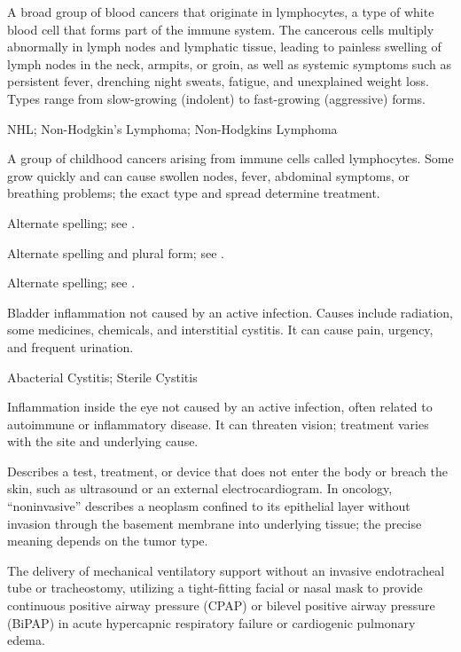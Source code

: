  A broad group of blood cancers that originate in lymphocytes, a type of white blood cell that forms part of the immune system. The cancerous cells multiply abnormally in lymph nodes and lymphatic tissue, leading to painless swelling of lymph nodes in the neck, armpits, or groin, as well as systemic symptoms such as persistent fever, drenching night sweats, fatigue, and unexplained weight loss. Types range from slow-growing (indolent) to fast-growing (aggressive) forms.


\synonyms
NHL; Non-Hodgkin's Lymphoma; Non-Hodgkins Lymphoma

 A group of childhood cancers arising from immune cells called lymphocytes. Some grow quickly and can cause swollen nodes, fever, abdominal symptoms, or breathing problems; the exact type and spread determine treatment.

 Alternate spelling; see .

 Alternate spelling and plural form; see .

 Alternate spelling; see .

 Bladder inflammation not caused by an active infection. Causes include radiation, some medicines, chemicals, and interstitial cystitis. It can cause pain, urgency, and frequent urination.

\synonyms
Abacterial Cystitis; Sterile Cystitis

 Inflammation inside the eye not caused by an active infection, often related to autoimmune or inflammatory disease. It can threaten vision; treatment varies with the site and underlying cause.

 Describes a test, treatment, or device that does not enter the body or breach the skin, such as ultrasound or an external electrocardiogram. In oncology, “noninvasive” describes a neoplasm confined to its epithelial layer without invasion through the basement membrane into underlying tissue; the precise meaning depends on the tumor type.

 The delivery of mechanical ventilatory support without an invasive endotracheal tube or tracheostomy, utilizing a tight-fitting facial or nasal mask to provide continuous positive airway pressure (CPAP) or bilevel positive airway pressure (BiPAP) in acute hypercapnic respiratory failure or cardiogenic pulmonary edema.

